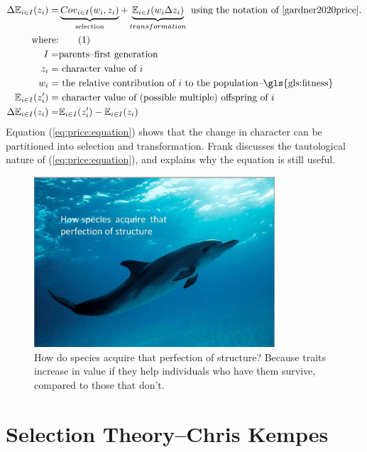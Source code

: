 \documentclass[]{article}
\newcommand\numberthis{\addtocounter{equation}{1}\tag{\theequation}}
\begin{document}
\begin{align*}
	\Delta \mathbb{E}_{i\in I}(z_i) =& \underbrace{Cov_{i\in I}(w_i,z_i)}_\text{selection} + \underbrace{\mathbb{E}_{i\in I}(w_i \Delta z_i)}_{transformation} \text{ using the notation of \cite{gardner2020price}.}\\
	\text{where:}& \numberthis \label{eq:price:equation}\\
	I =& \text{parents--first generation}\\
	z_i =& \text{ character value of $i$}\\
	w_i =& \text{ the relative contribution of $i$ to the population--\gls{gls:fitness}}\\
	\mathbb{E}_{i\in I}(z^\prime_i)=& \text{ character value of (possible multiple) offspring of $i$}\\
	\Delta \mathbb{E}_{i\in I}(z_i)=& \mathbb{E}_{i\in I}(z^\prime_i)-\mathbb{E}_{i\in I}(z_i)
\end{align*}
 Equation (\ref{eq:price:equation}) shows that the change in character can be partitioned into selection and transformation. Frank \cite{frank2012natural} discusses the tautological nature of (\ref{eq:price:equation}), and explains why the equation is still useful.
 
\begin{figure}[H]
	\begin{center}
		\caption[How do species acquire that perfection of structure? ]{How do species acquire that perfection of structure? Because traits increase in value if they help individuals who have them survive, compared to those that don't.}
		\includegraphics[width=0.8\textwidth]{dolphin}
	\end{center}
\end{figure}


\section[Selection Theory]{Selection Theory--Chris Kempes}
\end{document}
